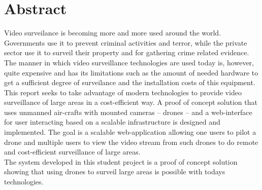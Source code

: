 \begingroup
\let\clearpage\relax
\let\cleardoublepage\relax
\let\cleardoublepage\relax

\chapter*{Abstract}
Video surveilance is becoming more and more used around the world.
Governments use it to prevent criminal activities and terror, while the private sector use it to surveil their property and for gathering crime related evidence.
The manner in which video surveillance technologies are used today is, however, quite expensive and has its limitations such as the amount of needed hardware to get a sufficient degree of surveilance and the installation costs of this equipment. \\

This report seeks to take advantage of modern technologies to provide video surveillance of large areas in a cost-efficient way. 
A proof of concept solution that uses unmanned air-crafts with mounted cameras -- drones -- and a web-interface for user interacting based on a scalable infrastructure is designed and implemented.
The goal is a scalable web-application allowing one users to pilot a drone and multiple users to view the video stream from such drones to do remote and cost-efficient surveillance of large areas. \\

The system developed in this student project is a proof of concept solution showing that using drones to surveil large areas is possible with todays technologies. 

\endgroup			

\vfill